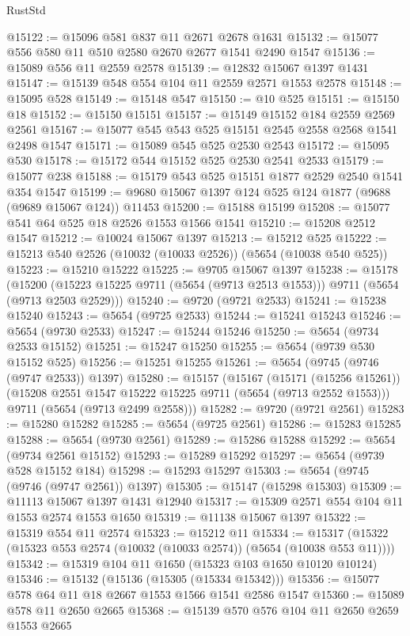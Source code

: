 \begin{lexlean}{RustStd}
\begin{coremodule}
@15122 := @15096 @581 @837 @11 @2671 @2678 @1631
@15132 := @15077 @556 @580 @11 @510 @2580 @2670 @2677 @1541 @2490 @1547
@15136 := @15089 @556 @11 @2559 @2578
@15139 := @12832 @15067 @1397 @1431
@15147 := @15139 @548 @554 @104 @11 @2559 @2571 @1553 @2578
@15148 := @15095 @528
@15149 := @15148 @547
@15150 := @10 @525
@15151 := @15150 @18
@15152 := @15150 @15151
@15157 := @15149 @15152 @184 @2559 @2569 @2561
@15167 := @15077 @545 @543 @525 @15151 @2545 @2558 @2568 @1541 @2498 @1547
@15171 := @15089 @545 @525 @2530 @2543
@15172 := @15095 @530
@15178 := @15172 @544 @15152 @525 @2530 @2541 @2533
@15179 := @15077 @238
@15188 := @15179 @543 @525 @15151 @1877 @2529 @2540 @1541 @354 @1547
@15199 := @9680 @15067 @1397 @124 @525 @124 @1877 (@9688 (@9689 @15067 @124)) @11453
@15200 := @15188 @15199
@15208 := @15077 @541 @64 @525 @18 @2526 @1553 @1566 @1541
@15210 := @15208 @2512 @1547
@15212 := @10024 @15067 @1397
@15213 := @15212 @525
@15222 := @15213 @540 @2526 (@10032 (@10033 @2526)) (@5654 (@10038 @540 @525))
@15223 := @15210 @15222
@15225 := @9705 @15067 @1397
@15238 := @15178
    (@15200 (@15223 @15225 @9711 (@5654 (@9713 @2513 @1553))) @9711 (@5654 (@9713 @2503 @2529)))
@15240 := @9720 (@9721 @2533)
@15241 := @15238 @15240
@15243 := @5654 (@9725 @2533)
@15244 := @15241 @15243
@15246 := @5654 (@9730 @2533)
@15247 := @15244 @15246
@15250 := @5654 (@9734 @2533 @15152)
@15251 := @15247 @15250
@15255 := @5654 (@9739 @530 @15152 @525)
@15256 := @15251 @15255
@15261 := @5654 (@9745 (@9746 (@9747 @2533)) @1397)
@15280 := @15157
    (@15167
      (@15171 (@15256 @15261))
      (@15208 @2551 @1547 @15222 @15225 @9711 (@5654 (@9713 @2552 @1553)))
      @9711
      (@5654 (@9713 @2499 @2558)))
@15282 := @9720 (@9721 @2561)
@15283 := @15280 @15282
@15285 := @5654 (@9725 @2561)
@15286 := @15283 @15285
@15288 := @5654 (@9730 @2561)
@15289 := @15286 @15288
@15292 := @5654 (@9734 @2561 @15152)
@15293 := @15289 @15292
@15297 := @5654 (@9739 @528 @15152 @184)
@15298 := @15293 @15297
@15303 := @5654 (@9745 (@9746 (@9747 @2561)) @1397)
@15305 := @15147 (@15298 @15303)
@15309 := @11113 @15067 @1397 @1431 @12940
@15317 := @15309 @2571 @554 @104 @11 @1553 @2574 @1553 @1650
@15319 := @11138 @15067 @1397
@15322 := @15319 @554 @11 @2574
@15323 := @15212 @11
@15334 := @15317 (@15322 (@15323 @553 @2574 (@10032 (@10033 @2574)) (@5654 (@10038 @553 @11))))
@15342 := @15319 @104 @11 @1650 (@15323 @103 @1650 @10120 @10124)
@15346 := @15132 (@15136 (@15305 (@15334 @15342)))
@15356 := @15077 @578 @64 @11 @18 @2667 @1553 @1566 @1541 @2586 @1547
@15360 := @15089 @578 @11 @2650 @2665
@15368 := @15139 @570 @576 @104 @11 @2650 @2659 @1553 @2665

\end{coremodule}
\end{lexlean}
